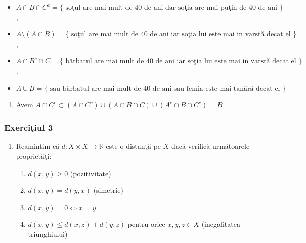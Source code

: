 \documentclass[]{article}
\providecommand{\tightlist}{%
  \setlength{\itemsep}{0pt}\setlength{\parskip}{0pt}}
\def\RR{{\mathbb R}}
\begin{document}
\begin{itemize}
  
    \item $A\cap B\cap C^{c}=\{\mbox{ so\c tul are mai mult de 40 de ani dar so\c tia are mai pu\c tin de 40 de ani }\}$, 
    
    \item $A\setminus{(A\cap B)}=\{\mbox{ so\c tul are mai mult de 40 de ani iar so\c tia lui este mai in varst\u a decat el }\}$,
    
    \item $A\cap B^{c}\cap C=\{\mbox{ b\u arbatul are mai mult de 40 de ani iar so\c tia lui este mai in varst\u a decat el }\}$,
    
    \item $A\cup B=\{\mbox{ sau b\u arbatul are mai mult de 40 de ani sau femia este mai tan\u ar\u a decat el }\}$
    
  \end{itemize}

\begin{enumerate}
\def\labelenumi{\alph{enumi})}
\setcounter{enumi}{2}
\tightlist
\item
  Avem
  \(A\cap C^c\subset\left(A\cap C^c\right)\cup\left(A\cap B\cap C\right)\cup\left(A^c\cap B\cap C^c\right)=B\)
\end{enumerate}

\subsubsection{\texorpdfstring{Exerci\c tiul
3}{Exerciiul 3}}\label{exerciiul-3}

\begin{enumerate}
\def\labelenumi{\alph{enumi})}
\item
  Reamintim c\u a \(d:X\times X\to \RR\) este o distan\c t\u a pe \(X\)
  dac\u a verific\u a urm\u atoarele propriet\u a\c ti:

  \begin{enumerate}
  \def\labelenumii{\roman{enumii})}
  \item
    \(d(x,y)\geq 0\) (pozitivitate)
  \item
    \(d(x,y)=d(y,x)\) (simetrie)
  \item
    \(d(x,y)=0 \iff x=y\)
  \item
    \(d(x,y)\leq d(x,z)+d(y,z)\) pentru orice \(x,y,z\in X\)
    (inegalitatea triunghiului)
  \end{enumerate}
\end{enumerate}
\end{document}
